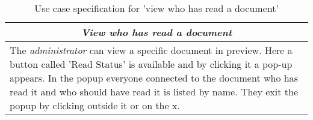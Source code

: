 \begin{table}
\centering
\begin{tabular}{p{12cm}}
\hline
\multicolumn{1}{c}{\textit{\textbf{View who has read a document}}} \\
\hline
The \textit{administrator} can view a specific document in preview.
Here a button called 'Read Status' is available and by clicking it a pop-up appears.
In the popup everyone connected to the document who has read it and who should have read it is listed by name.
They exit the popup by clicking outside it or on the x.
\\\hline
\end{tabular}
\caption{Use case specification for 'view who has read a document'}\label{tab:read-status}
\end{table}
